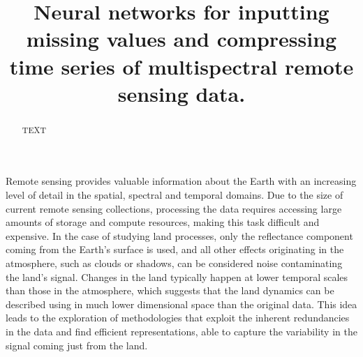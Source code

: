 \documentclass[essd, manuscript]{copernicus}
\begin{document}
\title{Neural networks for inputting missing values and compressing time series of multispectral remote sensing data.}











\received{}
\pubdiscuss{} %
\revised{}
\accepted{}
\published{}



\maketitle

\begin{abstract}
TEXT
\end{abstract}


\introduction  %

Remote sensing provides valuable information about the Earth with an increasing level of detail in the spatial, spectral and temporal domains. Due to the size of current remote sensing collections, processing the data requires accessing large amounts of storage and compute resources, making this task difficult and expensive. In the case of studying land processes, only the reflectance component coming from the Earth's surface is used, and all other effects originating in the atmosphere, such as clouds or shadows, can be considered noise contaminating the land's signal. Changes in the land typically happen at lower temporal scales than those in the atmosphere, which suggests that the land dynamics can be described using in much lower dimensional space than the original data. This idea leads to the exploration of methodologies that exploit the inherent redundancies in the data and find efficient representations, able to capture the variability in the signal coming just from the land.
\end{document}
